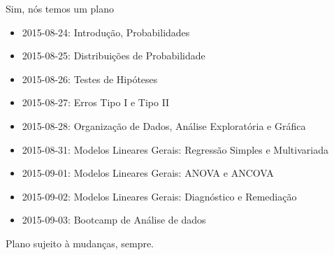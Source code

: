 \documentclass{beamer}\usepackage[]{graphicx}\usepackage[]{color}
\begin{document}
% 
%   
%   
%     
%       
%       

\begin{frame}{Sim, nós temos um plano} 

\begin{small}

  \begin{itemize}
    
    \item{2015-08-24: Introdução, Probabilidades}
    
    \item{2015-08-25: Distribuições de Probabilidade}
    
    \item{2015-08-26: Testes de Hipóteses}
    
    \item{2015-08-27: Erros Tipo I e Tipo II}
    
    \item{2015-08-28: Organização de Dados, Análise Exploratória e Gráfica}
    
    \item{2015-08-31: Modelos Lineares Gerais: Regressão Simples e Multivariada}
    
    \item{2015-09-01: Modelos Lineares Gerais: ANOVA e ANCOVA}
    
    \item{2015-09-02: Modelos Lineares Gerais: Diagnóstico e Remediação}
            
    \item{2015-09-03: Bootcamp de Análise de dados}
    
  \end{itemize}

\alert{Plano sujeito à mudanças, sempre.}

\end{small}

\end{frame} 
\end{document}
